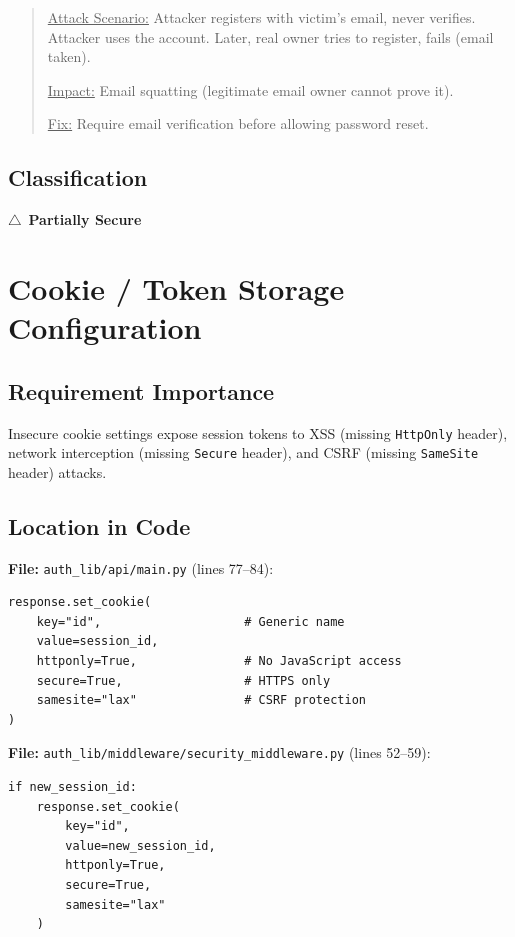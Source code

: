 \documentclass[11pt,a4paper]{article}
\newcommand{\partiallysecure}{\textcolor{warningorange}{$\triangle$~\textbf{Partially Secure}}}
\begin{document}
\begin{quote}
\underline{Attack Scenario:} Attacker registers with victim's email, never verifies. Attacker uses the account. Later, real owner tries to register, fails (email taken).

\underline{Impact:} Email squatting (legitimate email owner cannot prove it).

\underline{Fix:} Require email verification before allowing password reset.
\end{quote}

\subsection{Classification}
\partiallysecure

\newpage
\section{Cookie / Token Storage Configuration}

\subsection{Requirement Importance}
Insecure cookie settings expose session tokens to XSS (missing \texttt{HttpOnly} header), network interception (missing \texttt{Secure} header), and CSRF (missing \texttt{SameSite} header) attacks.

\subsection{Location in Code}

\textbf{File:} \texttt{auth\_lib/api/main.py} (lines 77--84):
\begin{lstlisting}
response.set_cookie(
    key="id",                    # Generic name
    value=session_id,
    httponly=True,               # No JavaScript access
    secure=True,                 # HTTPS only
    samesite="lax"               # CSRF protection
)
\end{lstlisting}

\textbf{File:} \texttt{auth\_lib/middleware/security\_middleware.py} (lines 52--59):
\begin{lstlisting}
if new_session_id:
    response.set_cookie(
        key="id",
        value=new_session_id,
        httponly=True,
        secure=True,
        samesite="lax"
    )
\end{lstlisting}
\end{document}
